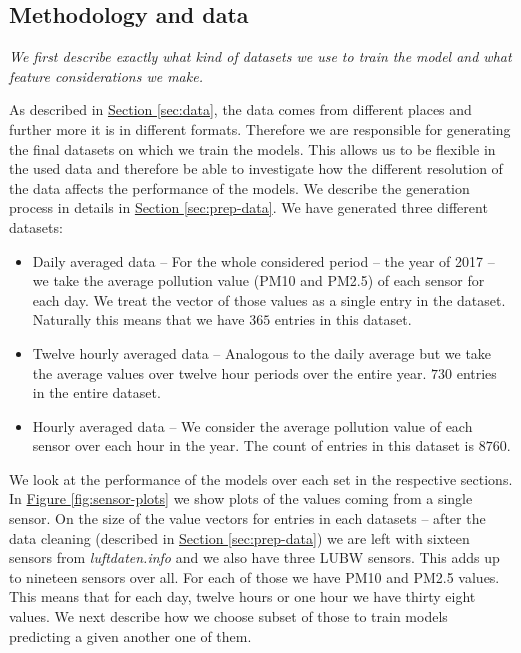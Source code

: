 \documentclass[12pt,a4paper,twoside]{scrartcl}
\numberwithin{equation}{section}
\newcommand{\reffig}[1]{\hyperref[#1]{Figure \ref*{#1}}}
\newcommand{\refsec}[1]{\hyperref[#1]{Section \ref*{#1}}}
\begin{document}
\subsection{Methodology and data}\label{sec:preprop-meth}
\noindent
\emph{We first describe exactly what kind of datasets we use to train the model and what feature considerations we make.}

As described in \refsec{sec:data}, the data comes from different places and further more it is in different formats. Therefore we are responsible for generating the final datasets on which we train the models. This allows us to be flexible in the used data and therefore be able to investigate how the different resolution of the data affects the performance of the models. We describe the generation process in details in \refsec{sec:prep-data}. We have generated three different datasets:
\begin{itemize}
\item Daily averaged data -- For the whole considered period -- the year of 2017 -- we take the average pollution value (PM10 and PM2.5) of each sensor for each day. We treat the vector of those values as a single entry in the dataset. Naturally this means that we have \(365\) entries in this dataset.
\item Twelve hourly averaged data -- Analogous to the daily average but we take the average values over twelve hour periods over the entire year. \(730\) entries in the entire dataset.
\item Hourly averaged data -- We consider the average pollution value of each sensor over each hour in the year. The count of entries in this dataset is \(8760\).
\end{itemize}
We look at the performance of the models over each set in the respective sections. In \reffig{fig:sensor-plots} we show plots of the values coming from a single sensor. On the size of the value vectors for entries in each datasets -- after the data cleaning (described in \refsec{sec:prep-data}) we are left with sixteen sensors from \emph{luftdaten.info} and we also have three LUBW sensors. This adds up to nineteen sensors over all. For each of those we have PM10 and PM2.5 values. This means that for each day, twelve hours or one hour we have thirty eight values. We next describe how we choose subset of those to train models predicting a given another one of them.
\end{document}
